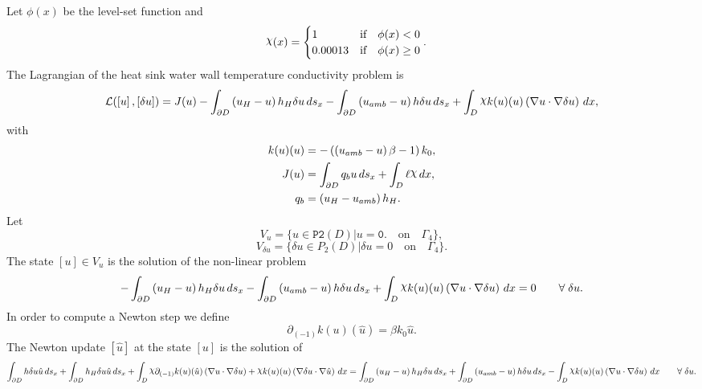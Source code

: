 \documentclass[preview]{standalone}
\let\oldcdot\cdot
\let\cdot\oldcdot
\begin{document}
Let $\phi(x)$ be the level-set function and
 \begin{align*}\raisebox{\depth}{$\chi$}(x) &= \begin{cases} 1 & \mbox{if}\quad \phi(x) < 0 \\ 0.00013 & \mbox{if}\quad \phi(x)  \ge 0 \end{cases}.\end{align*}
The Lagrangian of the heat sink water wall temperature conductivity problem is
\begin{dmath*}
\mathcal L(\left[ u\right],\left[ \delta u\right]) = J(u) -  \int_{\partial D} \left(u_{H} - u\right) h_{H} \delta u \,ds_x -  \int_{\partial D} \left(u_{amb} - u\right) h \delta u \,ds_x +  \int_{D} \raisebox{\depth}{$\chi$} k(u)(u) \left(  \nabla u  \cdot  \nabla \delta u  \right) \,dx , 
\end{dmath*}
with 
\begin{align*}
k(u)(u) &= - \left(\left(u_{amb} - u\right) \beta - 1\right) k_{0},\\
J(u) &=  \int_{\partial D} q_{b} u \,ds_x +  \int_{D} \ell \raisebox{\depth}{$\chi$} \,dx,\\
q_{b} &= \left(u_{H} - u_{amb}\right) h_{H}.
 \end{align*}
Let
\begin{equation*}
V_{u} = \{ u \in \mathtt{\text{P2}}(D)| u = \mathtt{\text{0.}}  \quad \text{{on}} \quad\Gamma_{4} \},\end{equation*}
\begin{equation*}
V_{\delta u} = \{ \delta u \in P_{2}(D)| \delta u = 0  \quad \text{{on}} \quad\Gamma_{4} \}.\end{equation*}
The state $\left[ u\right] \in  V_{u}$ is the solution of the non-linear problem
\begin{dmath*}
-  \int_{\partial D} \left(u_{H} - u\right) h_{H} \delta u \,ds_x -  \int_{\partial D} \left(u_{amb} - u\right) h \delta u \,ds_x +  \int_{D} \raisebox{\depth}{$\chi$} k(u)(u) \left(  \nabla u  \cdot  \nabla \delta u  \right) \,dx = 0\qquad \forall\; \delta u . 
\end{dmath*}
In order to compute a Newton step we define
\begin{dmath*}
\partial_{(-1)} k(u)(\hat u) = \beta k_{0} \hat u.
 \end{dmath*}
The Newton update $\left[ \hat u\right]$ at the state $\left[ u\right]$ is the solution of
\begin{dmath*}
 \int_{\partial D} h \delta u \hat u \,ds_x +  \int_{\partial D} h_{H} \delta u \hat u \,ds_x +  \int_{D} \raisebox{\depth}{$\chi$} \partial_{(-1)} k(u)(\hat u) \left(  \nabla u  \cdot  \nabla \delta u  \right) + \raisebox{\depth}{$\chi$} k(u)(u) \left(  \nabla \delta u  \cdot  \nabla \hat u  \right) \,dx =  \int_{\partial D} \left(u_{H} - u\right) h_{H} \delta u \,ds_x +  \int_{\partial D} \left(u_{amb} - u\right) h \delta u \,ds_x -  \int_{D} \raisebox{\depth}{$\chi$} k(u)(u) \left(  \nabla u  \cdot  \nabla \delta u  \right) \,dx\qquad \forall\; \delta u . 
\end{dmath*}
\end{document}
